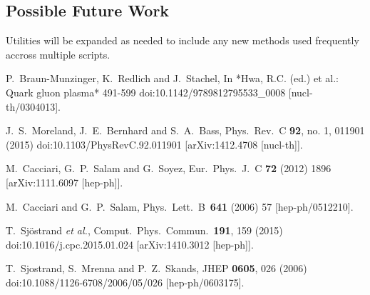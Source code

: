 \documentclass[11pt]{article}
\begin{document}
\subsection{Possible Future Work}
Utilities will be expanded as needed to include any new methods used frequently accross multiple scripts.


\begin{thebibliography}{10}

  P.~Braun-Munzinger, K.~Redlich and J.~Stachel,
  In *Hwa, R.C. (ed.) et al.: Quark gluon plasma* 491-599
  doi:10.1142/9789812795533\_0008
  [nucl-th/0304013].

  J.~S.~Moreland, J.~E.~Bernhard and S.~A.~Bass,
  Phys.\ Rev.\ C {\bf 92}, no. 1, 011901 (2015)
  doi:10.1103/PhysRevC.92.011901
  [arXiv:1412.4708 [nucl-th]].

  M.~Cacciari, G.~P.~Salam and G.~Soyez,
  Eur.\ Phys.\ J.\ C {\bf 72} (2012) 1896
  [arXiv:1111.6097 [hep-ph]].

  M.~Cacciari and G.~P.~Salam,
  Phys.\ Lett.\ B\ {\bf 641} (2006) 57
  [hep-ph/0512210].

  T.~Sjöstrand {\it et al.},
  Comput.\ Phys.\ Commun.\  {\bf 191}, 159 (2015)
  doi:10.1016/j.cpc.2015.01.024
  [arXiv:1410.3012 [hep-ph]].

  T.~Sjostrand, S.~Mrenna and P.~Z.~Skands,
  JHEP {\bf 0605}, 026 (2006)
  doi:10.1088/1126-6708/2006/05/026
  [hep-ph/0603175].


\end{thebibliography}
\end{document}
